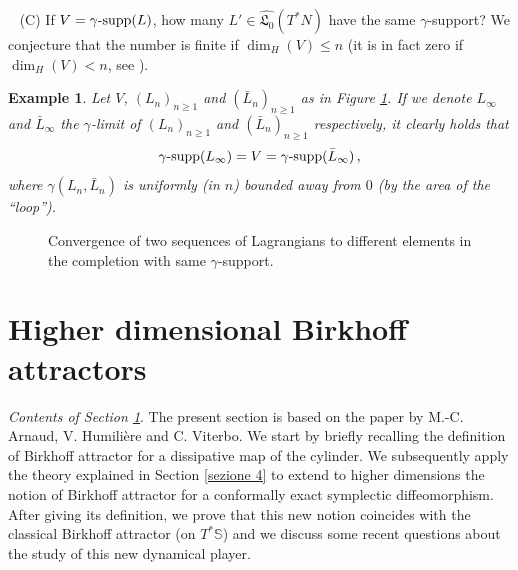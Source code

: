 \documentclass{article}
\newcommand{\1}{\mathbbm{1}}
\newtheorem{es}{Example}
\theoremstyle{remark}
\begin{document}
{{~\newline
(C) If $V = \gamma\textnormal{-supp}(L)$, how many $L' \in \widehat{\mathfrak{L}_0}(T^*N)$ have the same $\gamma$-support? 
We conjecture that the number is finite if $\dim_H(V)\leq n$ (it is in fact zero if $\dim_H(V)<n$, see \cite[Prop 9.9]{vit22}). 
\begin{es} {\textnormal{Let $V$, $(L_n)_{n \ge 1}$ and $(\bar{L}_n)_{n \ge 1}$ as in Figure \ref{fig:limLag}. If we denote $L_{\infty}$ and $\bar{L}_{\infty}$ the $\gamma$-limit of $(L_n)_{n \ge 1}$ and $(\bar{L}_n)_{n \ge 1}$ respectively, it clearly holds that
$$\gamma\textnormal{-supp}(L_{\infty}) = V = \gamma\textnormal{-supp}(\bar{L}_{\infty})\, ,$$
where $\gamma(L_n,\bar{L}_n)$ is uniformly (in $n$) bounded away from $0$ (by the area of the ``loop'').}} 
\end{es}
\begin{figure}[H]
  \centering
    
  \caption{Convergence of two sequences of Lagrangians to different elements in the completion with same $\gamma$-support.}
  \label{fig:limLag}
\end{figure}

\section{Higher dimensional Birkhoff attractors}\label{sezione 5}
\begin{center}

\begin{minipage}{10 cm}
\textit{Contents of Section \ref{sezione 5}}. The present section is based on the paper \cite{arnHumVit24} by M.-C. Arnaud, V. Humilière and C. Viterbo. We start by briefly recalling the definition of Birkhoff attractor for a dissipative map of the cylinder. We subsequently apply the theory explained in Section \ref{sezione 4} to extend to higher dimensions the notion of Birkhoff attractor for a conformally exact symplectic diffeomorphism. After giving its definition, we prove that this new notion coincides with the classical Birkhoff attractor (on $T^*\mathbb{S}$) and we discuss some recent questions about the study of this new dynamical player.
\end{minipage}
\end{center}
}}
\end{document}
